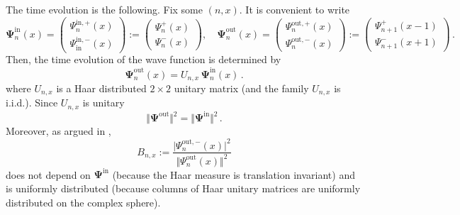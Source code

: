 \documentclass[a4paper,11pt,oneside,reqno]{amsart}
\theoremstyle{definition}
\numberwithin{equation}{section}
\begin{document}
The time evolution is the following. Fix some $(n,x)$. It is convenient to write 
\begin{equation*}
	\mathbf{\Psi}_{n}^{\text{in}}(x)= \begin{pmatrix}
		\Psi_{n}^{\text{in},+}(x)\\ \Psi_{\text{in}}^{\text{in},-}(x)
	\end{pmatrix}:=\begin{pmatrix}
		\Psi^{+}_n(x)\\
		\Psi^{-}_n(x)
	\end{pmatrix}, \quad 	\mathbf{\Psi}_{n}^{\text{out}}(x)= \begin{pmatrix}
		\Psi_{n}^{\text{out},+}(x) \\ \Psi_{n}^{\text{out},-}(x)
	\end{pmatrix}:=\begin{pmatrix}
		\Psi^{+}_{n+1}(x-1)\\
		\Psi^{-}_{n+1}(x+1)
	\end{pmatrix}\,.
\end{equation*}
Then, the time evolution of the wave function is determined by 
\begin{equation*}
	\mathbf{\Psi}^{\text{out}}_n(x)=U_{n,x}\,\mathbf{\Psi}^{\text{in}}_n(x)\,.
\end{equation*} 
where $U_{n,x}$ is a Haar distributed $2\times 2$ unitary matrix (and the family  $U_{n,x}$ is i.i.d.). Since $U_{n,x}$ is unitary 
\begin{equation*}
	\Vert\mathbf{\Psi}^{\text{out}}\Vert^{2}=\Vert\mathbf{\Psi}^{\text{in}}\Vert^{2}\,.
\end{equation*} 
Moreover, as argued in \cite{kardar1992}, 
\begin{equation} \label{environment-kardar}
	B_{n,x} := \frac{\vert \Psi_{n}^{\text{out},-}(x)\vert^2}{\Vert \Psi_{n }^{\text{out}}(x)\Vert^2} \end{equation}
does not depend on $\mathbf{\Psi}^{\text{in}}$ (because the Haar measure is translation invariant) and is uniformly distributed (because columns of Haar unitary matrices are uniformly distributed on the complex sphere). 
\end{document}
